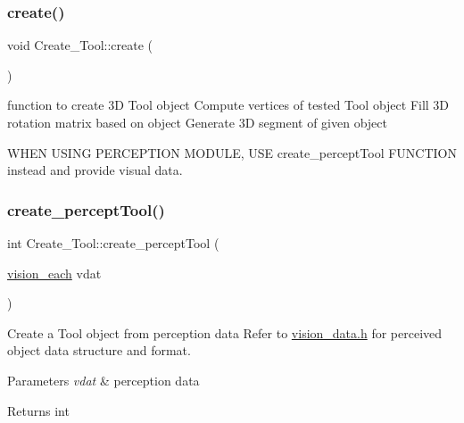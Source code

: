 \subsubsection{\texorpdfstring{create()}{create()}}
{\footnotesize\ttfamily void Create\+\_\+\+Tool\+::create (\begin{DoxyParamCaption}{ }\end{DoxyParamCaption})}



function to create 3D Tool object Compute vertices of tested \textquotesingle{}Tool\textquotesingle{} object Fill 3D rotation matrix based on object Generate 3D segment of given object 

W\+H\+EN U\+S\+I\+NG P\+E\+R\+C\+E\+P\+T\+I\+ON M\+O\+D\+U\+LE, U\+SE create\+\_\+percept\+Tool F\+U\+N\+C\+T\+I\+ON instead and provide visual data. \mbox{\label{classCreate__Tool_a59a084db075fa28aad8251f8c9aee653}} 
\subsubsection{\texorpdfstring{create\+\_\+percept\+Tool()}{create\_perceptTool()}}
{\footnotesize\ttfamily int Create\+\_\+\+Tool\+::create\+\_\+percept\+Tool (\begin{DoxyParamCaption}\item[{\hyperlink{structvision__each}{vision\+\_\+each}}]{vdat }\end{DoxyParamCaption})}



Create a \textquotesingle{}Tool\textquotesingle{} object from perception data Refer to \hyperlink{vision__data_8h}{vision\+\_\+data.\+h} for perceived object data structure and format. 


\begin{DoxyParams}{Parameters}
{\em vdat} & perception data \\
\hline
\end{DoxyParams}
\begin{DoxyReturn}{Returns}
int 
\end{DoxyReturn}
\mbox{\label{classCreate__Tool_a7f49a49b557bdde922b2bb7e9c230c6f}} 
